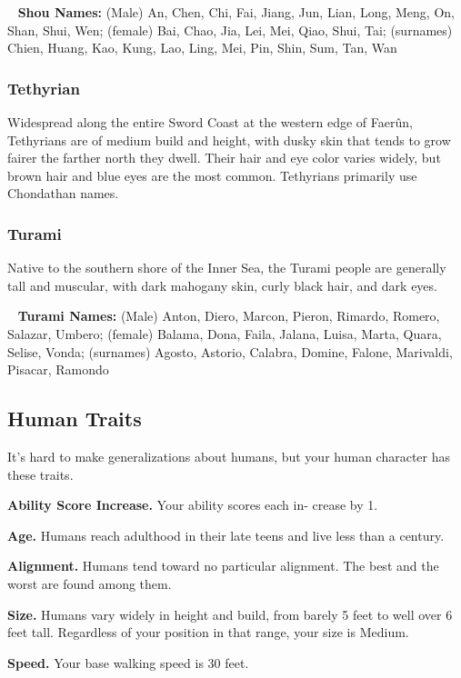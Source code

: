 \ \newline
\noindent \textbf{Shou Names:} \hangindent=0.3cm (Male) An, Chen, Chi, Fai, Jiang, Jun, Lian, Long, Meng, On, Shan, Shui, Wen; (female) Bai, Chao, Jia, Lei, Mei, Qiao, Shui, Tai; (surnames) Chien, Huang, Kao, Kung, Lao, Ling, Mei, Pin, Shin, Sum, Tan, Wan

\subsubsection{Tethyrian}
Widespread along the entire Sword Coast at the western edge of Faerûn, Tethyrians are of medium build and height, with dusky skin that tends to grow fairer the farther north they dwell. Their hair and eye color varies widely, but brown hair and blue eyes are the most common. Tethyrians primarily use Chondathan names.

\subsubsection{Turami}
Native to the southern shore of the Inner Sea, the Turami people are generally tall and muscular, with dark mahogany skin, curly black hair, and dark eyes.

\ \newline
\noindent \textbf{Turami Names:} \hangindent=0.3cm (Male) Anton, Diero, Marcon, Pieron, Rimardo, Romero, Salazar, Umbero; (female) Balama, Dona, Faila, Jalana, Luisa, Marta, Quara, Selise, Vonda; (surnames) Agosto, Astorio, Calabra, Domine, Falone, Marivaldi, Pisacar, Ramondo

\subsection{Human Traits}
It’s hard to make generalizations about humans, but your human character has these traits.

\textbf{Ability Score Increase.} Your ability scores each in- crease by 1.

\textbf{Age.} Humans reach adulthood in their late teens and live less than a century.

\textbf{Alignment.} Humans tend toward no particular alignment. The best and the worst are found among them.

\textbf{Size.} Humans vary widely in height and build, from barely 5 feet to well over 6 feet tall. Regardless of your position in that range, your size is Medium.

\textbf{Speed.} Your base walking speed is 30 feet.

